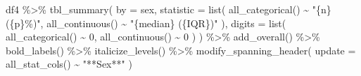 \documentclass[
  letterpaper,
  DIV=11,
  numbers=noendperiod]{scrartcl}
\newenvironment{Shaded}{\begin{snugshade}}{\end{snugshade}}
\newcommand{\AttributeTok}[1]{\textcolor[rgb]{0.40,0.45,0.13}{#1}}
\newcommand{\DecValTok}[1]{\textcolor[rgb]{0.68,0.00,0.00}{#1}}
\newcommand{\FunctionTok}[1]{\textcolor[rgb]{0.28,0.35,0.67}{#1}}
\newcommand{\NormalTok}[1]{\textcolor[rgb]{0.00,0.23,0.31}{#1}}
\newcommand{\SpecialCharTok}[1]{\textcolor[rgb]{0.37,0.37,0.37}{#1}}
\newcommand{\StringTok}[1]{\textcolor[rgb]{0.13,0.47,0.30}{#1}}
\begin{document}
\begin{Shaded}
\begin{Highlighting}[]
\NormalTok{df4 }\SpecialCharTok{\%\textgreater{}\%}
  \FunctionTok{tbl\_summary}\NormalTok{(}
    \AttributeTok{by =}\NormalTok{ sex,}
    \AttributeTok{statistic =} \FunctionTok{list}\NormalTok{(}
      \FunctionTok{all\_categorical}\NormalTok{() }\SpecialCharTok{\textasciitilde{}} \StringTok{"\{n\} (\{p\}\%)"}\NormalTok{,}
      \FunctionTok{all\_continuous}\NormalTok{()  }\SpecialCharTok{\textasciitilde{}} \StringTok{"\{median\} (\{IQR\})"}
\NormalTok{    ),}
    \AttributeTok{digits =} \FunctionTok{list}\NormalTok{(}
      \FunctionTok{all\_categorical}\NormalTok{() }\SpecialCharTok{\textasciitilde{}} \DecValTok{0}\NormalTok{,}
      \FunctionTok{all\_continuous}\NormalTok{()  }\SpecialCharTok{\textasciitilde{}} \DecValTok{0}
\NormalTok{    )}
\NormalTok{  ) }\SpecialCharTok{\%\textgreater{}\%}
  \FunctionTok{add\_overall}\NormalTok{() }\SpecialCharTok{\%\textgreater{}\%}
   \FunctionTok{bold\_labels}\NormalTok{() }\SpecialCharTok{\%\textgreater{}\%}
  \FunctionTok{italicize\_levels}\NormalTok{() }\SpecialCharTok{\%\textgreater{}\%}
  \FunctionTok{modify\_spanning\_header}\NormalTok{(}
    \AttributeTok{update =} \FunctionTok{all\_stat\_cols}\NormalTok{() }\SpecialCharTok{\textasciitilde{}} \StringTok{"**Sex**"}
\NormalTok{  ) }
\end{Highlighting}
\end{Shaded}
\end{document}

